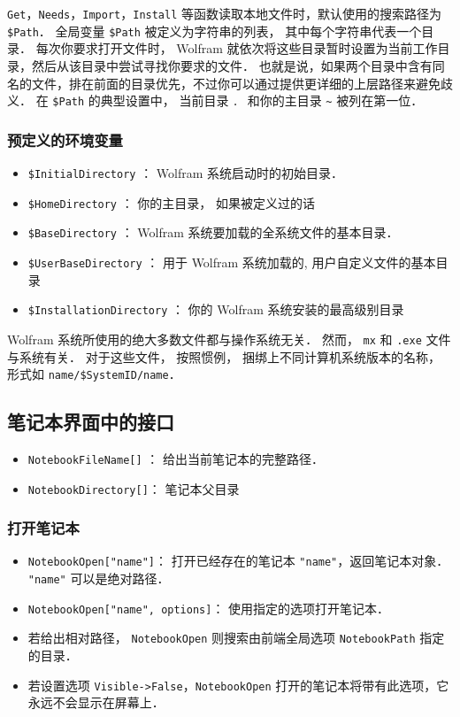 \verb`Get`，\verb`Needs`，\verb`Import`，\verb`Install` 等函数读取本地文件时，默认使用的搜索路径为 \verb`$Path`．
全局变量 \verb`$Path` 被定义为字符串的列表， 其中每个字符串代表一个目录．
每次你要求打开文件时， Wolfram 就依次将这些目录暂时设置为当前工作目录，然后从该目录中尝试寻找你要求的文件．
也就是说，如果两个目录中含有同名的文件，排在前面的目录优先，不过你可以通过提供更详细的上层路径来避免歧义．
在 \verb`$Path` 的典型设置中， 当前目录 \verb`．` 和你的主目录 \verb`~` 被列在第一位．

\subsubsection{预定义的环境变量}

\begin{itemize}
\item \verb`$InitialDirectory` ： Wolfram 系统启动时的初始目录．
\item \verb`$HomeDirectory` ：  你的主目录， 如果被定义过的话
\item \verb`$BaseDirectory` ：  Wolfram 系统要加载的全系统文件的基本目录．
\item \verb`$UserBaseDirectory` ：  用于 Wolfram 系统加载的, 用户自定义文件的基本目录
\item \verb`$InstallationDirectory` ：  你的 Wolfram 系统安装的最高级别目录
\end{itemize}

Wolfram 系统所使用的绝大多数文件都与操作系统无关． 然而， \verb`mx` 和 \verb`.exe` 文件与系统有关．
对于这些文件， 按照惯例， 捆绑上不同计算机系统版本的名称， 形式如 \verb`name/$SystemID/name`．

\subsection{笔记本界面中的接口}

\begin{itemize}
\item \verb`NotebookFileName[]` ： 给出当前笔记本的完整路径．
\item \verb`NotebookDirectory[]`： 笔记本父目录
\end{itemize}

\subsubsection{打开笔记本}

\begin{itemize}
\item \verb`NotebookOpen["name"]`：  打开已经存在的笔记本 \verb`"name"`，返回笔记本对象． \verb`"name"` 可以是绝对路径．
\item \verb`NotebookOpen["name", options]`： 使用指定的选项打开笔记本．
\item 若给出相对路径， \verb`NotebookOpen` 则搜索由前端全局选项 \verb`NotebookPath` 指定的目录．
\item 若设置选项 \verb`Visible->False`，\verb`NotebookOpen` 打开的笔记本将带有此选项，它永远不会显示在屏幕上．
\end{itemize}

